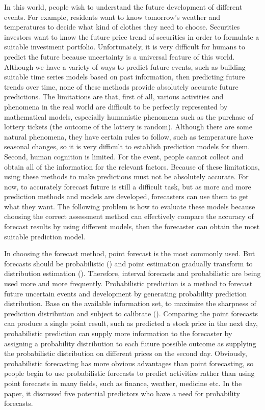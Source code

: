 \documentclass{monashthesis}
\theoremstyle{definition}
\theoremstyle{definition}
\theoremstyle{definition}
\theoremstyle{remark}
\begin{document}
In this world, people wish to understand the future development of
different events. For example, residents want to know tomorrow's weather
and temperatures to decide what kind of clothes they need to choose.
Securities investors want to know the future price trend of securities
in order to formulate a suitable investment portfolio. Unfortunately, it
is very difficult for humans to predict the future because uncertainty
is a universal feature of this world. Although we have a variety of ways
to predict future events, such as building suitable time series models
based on past information, then predicting future trends over time, none
of these methods provide absolutely accurate future predictions. The
limitations are that, first of all, various activities and phenomena in
the real world are difficult to be perfectly represented by mathematical
models, especially humanistic phenomena such as the purchase of lottery
tickets (the outcome of the lottery is random). Although there are some
natural phenomena, they have certain rules to follow, such as
temperature have seasonal changes, so it is very difficult to establish
prediction models for them. Second, human cognition is limited. For the
event, people cannot collect and obtain all of the information for the
relevant factors. Because of these limitations, using these methods to
make predictions must not be absolutely accurate. For now, to accurately
forecast future is still a difficult task, but as more and more
prediction methods and models are developed, forecasters can use them to
get what they want. The following problem is how to evaluate these
models because choosing the correct assessment method can effectively
compare the accuracy of forecast results by using different models, then
the forecaster can obtain the most suitable prediction model.

In choosing the forecast method, point forecast is the most commonly
used. But forecasts should be probabilistic (\textcite{GK14}) and point
estimation gradually transform to distribution estimation
(\textcite{S75}). Therefore, interval forecasts and probabilistic are
being used more and more frequently. Probabilistic prediction is a
method to forecast future uncertain events and development by generating
probability prediction distribution. Base on the available information
set, to maximize the sharpness of prediction distribution and subject to
calibrate (\textcite{GK14}). Comparing the point forecasts can produce a
single point result, such as predicted a stock price in the next day,
probabilistic prediction can supply more information to the forecaster
by assigning a probability distribution to each future possible outcome
as supplying the probabilistic distribution on different prices on the
second day. Obviously, probabilistic forecasting has more obvious
advantages than point forecasting, so people begin to use probabilistic
forecasts to predict activities rather than using point forecasts in
many fields, such as finance, weather, medicine etc. In the
\textcite{R16} paper, it discussed five potential predictors who have a
need for probability forecasts.
\end{document}

